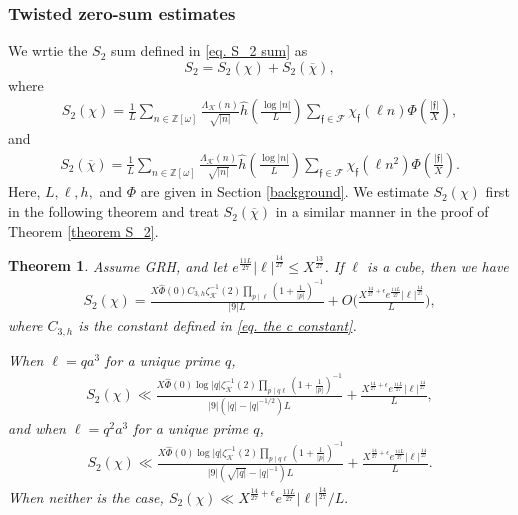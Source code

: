 \documentclass[11pt]{amsart}
\newtheorem{theorem}[prop]{Theorem}
\numberwithin{equation}{section}
\theoremstyle{remark}
\begin{document}
\subsubsection{Twisted zero-sum estimates}
We wrtie the $S_2$ sum defined in \eqref{eq. S_2 sum} as
$$S_2=S_2(\chi)+S_2(\overline{\chi}),$$
where
\begin{align*}
    S_2(\chi) = 
    \frac{1}{L}\sum_{n \in \mathbb{Z}[\omega]} \frac{\Lambda_\mathcal{K}(n)}{\sqrt{|n|}}\hat{h}\left(\frac{\log |n|}{L}\right)
    \sum_{\mathfrak{f}\in \mathcal{F}} \chi_\mathfrak{f}(\ell n) 
     \Phi\left(\frac{|\mathfrak{f}|}{X}\right),
\end{align*}
and
\begin{align*}
    S_2(\overline{\chi})
    =
    \frac{1}{L}\sum_{n \in \mathbb{Z}[\omega]} \frac{\Lambda_\mathcal{K}(n)}{\sqrt{|n|}}\hat{h}\left(\frac{\log |n|}{L}\right)
    \sum_{\mathfrak{f}\in \mathcal{F}} \chi_\mathfrak{f}(\ell n^2) 
    \Phi\left(\frac{|\mathfrak{f}|}{X}\right).
\end{align*}
Here, $L, \ell, h,$ and $\Phi$ are given in Section \ref{background}. We estimate $S_2(\chi)$ first in the following theorem and treat $S_2(\overline{\chi})$ in a similar manner in the proof of Theorem \ref{theorem S_2}.

\begin{theorem}\label{theorem S_2 chi}
Assume GRH, and let $e^{\frac{11L}{27}}|\ell|^{\frac{14}{27}}\le X^{\frac{13}{27}}$. If $\ell$ is a cube, then we have
    \begin{align*}
    S_2(\chi)
    =
    \frac{X\widehat{\Phi}(0)C_{3, h}\zeta^{-1}_\mathcal{K}(2)  \prod_{p\mid \ell}(1+\frac{1}{|p|})^{-1}
    }{|9|L}
    +O\bigg(\frac{X^{\frac{14}{27}+\epsilon}e^{\frac{11L}{27}}|\ell|^{\frac{14}{27}}}{L} \bigg),
    \end{align*}
    where $C_{3,h}$ is the constant defined in \eqref{eq. the c constant}.
    
    When $\ell=qa^3$ for a unique prime $q$, 
    \begin{align*}
    S_2(\chi)
    \ll
     \frac{X\widehat{\Phi}(0)\log|q|\zeta^{-1}_\mathcal{K}(2)  \prod_{p\mid q \ell }(1+\frac{1}{|p|})^{-1}}{|9|(|q|-|q|^{-1/2})L} 
    + 
    \frac{X^{\frac{14}{27}+\epsilon}e^{\frac{11L}{27}}|\ell|^{\frac{14}{27}}}{L},
    \end{align*}
    and when $\ell=q^2a^3$ for a unique prime $q$, 
    \begin{align*}
    S_2(\chi)
    \ll
     \frac{X\widehat{\Phi}(0)\log|q|\zeta^{-1}_\mathcal{K}(2)  \prod_{p\mid q \ell }(1+\frac{1}{|p|})^{-1}}{|9|(\sqrt{|q|}-|q|^{-1})L} 
    + 
    \frac{X^{\frac{14}{27}+\epsilon}e^{\frac{11L}{27}}|\ell|^{\frac{14}{27}}}{L}.
    \end{align*}
    When neither is the case, 
    $S_2(\chi)
    \ll
    X^{\frac{14}{27}+\epsilon}e^{\frac{11L}{27}}|\ell|^{\frac{14}{27}}/{L}.$
    \end{theorem}
\end{document}
